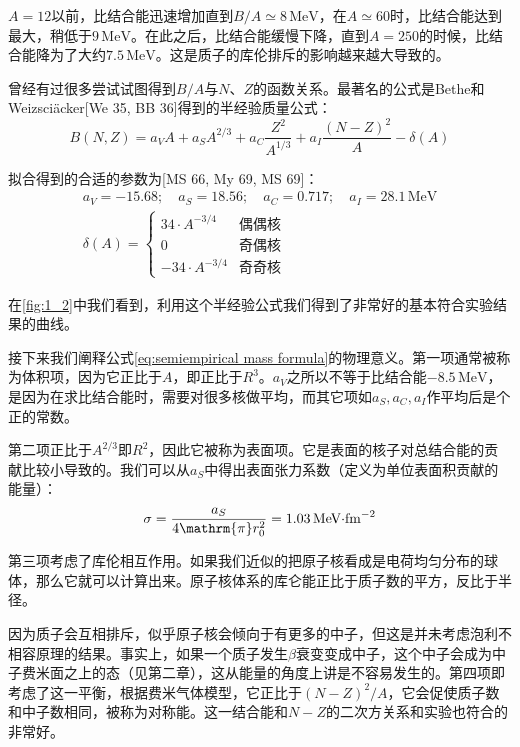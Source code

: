 $A=12$以前，比结合能迅速增加直到$B/A\simeq8\,\text{MeV}$，在$A\simeq60$时，比结合能达到最大，稍低于$9\,\text{MeV}$。在此之后，比结合能缓慢下降，直到$A=250$的时候，比结合能降为了大约$7.5\,\text{MeV}$。这是质子的库伦排斥的影响越来越大导致的。

曾经有过很多尝试试图得到$B/A$与$N$、$Z$的函数关系。最著名的公式是Bethe和Weizsci\"acker{[}We
35, BB 36{]}得到的半经验质量公式：
\begin{equation}
B(N,Z)=a_{V}A+a_{S}A^{2/3}+a_{C}\frac{Z^{2}}{A^{1/3}}+a_{I}\frac{(N-Z)^{2}}{A}-\delta(A)\label{eq:semiempirical mass formula}
\end{equation}

拟合得到的合适的参数为{[}MS 66, My 69, MS 69{]}：
\begin{gather*}
a_{V}=-15.68;\quad a_{S}=18.56;\quad a_{C}=0.717;\quad a_{I}=28.1\,\text{MeV}\\
\delta(A)=\begin{cases}
34\cdot A^{-3/4} & \text{偶偶核}\\
0 & \text{奇偶核}\\
-34\cdot A^{-3/4} & \text{奇奇核}
\end{cases}
\end{gather*}

在\ref{fig:1_2}中我们看到，利用这个半经验公式我们得到了非常好的基本符合实验结果的曲线。

接下来我们阐释公式\ref{eq:semiempirical mass formula}的物理意义。第一项通常被称为体积项，因为它正比于$A$，即正比于$R^{3}$。$a_{V}$之所以不等于比结合能$-8.5\,\text{MeV}$，是因为在求比结合能时，需要对很多核做平均，而其它项如$a_{S},a_{C},a_{I}$作平均后是个正的常数。

第二项正比于$A^{2/3}$即$R^{2}$，因此它被称为表面项。它是表面的核子对总结合能的贡献比较小导致的。我们可以从$a_{S}$中得出表面张力系数（定义为单位表面积贡献的能量）：
\[
\sigma=\frac{a_{S}}{4\mathrm{\pi}r^{2}_{0}}=1.03\,\text{MeV\ensuremath{\cdot}\text{fm}}^{-2}
\]

第三项考虑了库伦相互作用。如果我们近似的把原子核看成是电荷均匀分布的球体，那么它就可以计算出来。原子核体系的库仑能正比于质子数的平方，反比于半径。

因为质子会互相排斥，似乎原子核会倾向于有更多的中子，但这是并未考虑泡利不相容原理的结果。事实上，如果一个质子发生$\beta$衰变变成中子，这个中子会成为中子费米面之上的态（见第二章），这从能量的角度上讲是不容易发生的。第四项即考虑了这一平衡，根据费米气体模型，它正比于$(N-Z)^{2}/A$，它会促使质子数和中子数相同，被称为对称能。这一结合能和$N-Z$的二次方关系和实验也符合的非常好。

